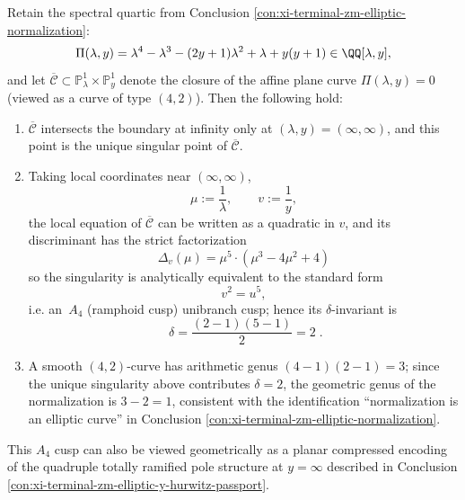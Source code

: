 ﻿%
%

\begin{conclusion}[Unique singularity of the spectral curve at infinity: an \texorpdfstring{$A_4$}{A4}-type unibranch cusp with \texorpdfstring{$\delta=2$}{delta=2}]\label{con:xi-terminal-zm-spectral-curve-infty-a4-cusp}
Retain the spectral quartic from Conclusion \ref{con:xi-terminal-zm-elliptic-normalization}:
\[
\Pi(\lambda,y)=\lambda^4-\lambda^3-(2y+1)\lambda^2+\lambda+y(y+1)\in\QQ[\lambda,y],
\]
and let \(\overline{\mathcal C}\subset \mathbb P^1_\lambda\times \mathbb P^1_y\) denote the closure of the affine plane curve \(\Pi(\lambda,y)=0\) (viewed as a curve of type \((4,2)\)).
Then the following hold:
\begin{enumerate}
  \item \(\overline{\mathcal C}\) intersects the boundary at infinity only at \((\lambda,y)=(\infty,\infty)\), and this point is the unique singular point of \(\overline{\mathcal C}\).
  \item Taking local coordinates near \((\infty,\infty)\),
  \[
  \mu:=\frac{1}{\lambda},\qquad v:=\frac{1}{y},
  \]
  the local equation of \(\overline{\mathcal C}\) can be written as a quadratic in \(v\), and its discriminant has the strict factorization
  \[
  \boxed{\;\Delta_v(\mu)=\mu^5\cdot(\mu^3-4\mu^2+4)\;}
  \]
  so the singularity is analytically equivalent to the standard form
  \[
  v^2=u^5,
  \]
  i.e. an \(\,A_4\) (ramphoid cusp) unibranch cusp; hence its \(\delta\)-invariant is
  \[
  \boxed{\;\delta=\frac{(2-1)(5-1)}{2}=2\; }.
  \]
  \item A smooth \((4,2)\)-curve has arithmetic genus \((4-1)(2-1)=3\); since the unique singularity above contributes \(\delta=2\), the geometric genus of the normalization is \(3-2=1\), consistent with the identification ``normalization is an elliptic curve'' in Conclusion \ref{con:xi-terminal-zm-elliptic-normalization}.
\end{enumerate}
This \(A_4\) cusp can also be viewed geometrically as a planar compressed encoding of the quadruple totally ramified pole structure at \(y=\infty\) described in Conclusion \ref{con:xi-terminal-zm-elliptic-y-hurwitz-passport}.
\end{conclusion}
